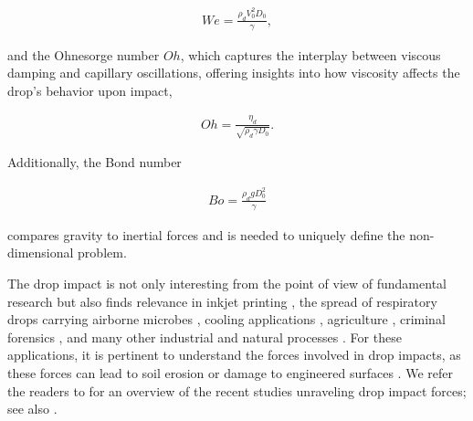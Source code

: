 \documentclass{jfm}
\begin{document}
\begin{align}
	\label{Eq:WeDefinition}
	We = \frac{\rho_d V_0^2 D_0}{\gamma},
\end{align}

\noindent and the Ohnesorge number $Oh$, which captures the interplay between viscous damping and capillary oscillations, offering insights into how viscosity affects the drop's behavior upon impact,

\begin{align}
	\label{Eq:OhDefinition}
	Oh = \frac{\eta_d}{\sqrt{\rho_d \gamma D_0}}.
\end{align}

\noindent Additionally, the Bond number

\begin{align}
	\label{Eq:BoDefinition}
	Bo = \frac{\rho_dgD_0^2}{\gamma}
\end{align}

\noindent compares gravity to inertial forces and is needed to uniquely define the non-dimensional problem.  

The drop impact is not only interesting from the point of view of fundamental research but also finds relevance in inkjet printing \citep{lohse2022fundamental}, the spread of respiratory drops carrying airborne microbes \citep{bourouiba2021fluid, ji2021compound, pohlker2023respiratory}, cooling applications \citep{kim2007spray, shiri2017heat, jowkar2019rebounding}, agriculture \citep{bergeron2000controlling, bartolo2007dynamics, kooij2018determines, sijs2020effect, he2021optimization, hoffman2021controlling}, criminal forensics \citep{smith2018influence, smith-2018-curropincolloidinterfacesci}, and many other industrial and natural processes \citep{rein-1993-fluiddynres, yarin2006drop, Tuteja2007, Cho2016, Josserand2016, Yarin2017, Liu2017, Hao2016, Yarin2017, Wu2020}. For these applications, it is pertinent to understand the forces involved in drop impacts, as these forces can lead to soil erosion \citep{Nearing1986} or damage to engineered surfaces \citep{Ahmad2013, Amirzadeh2017, Gohardani2011}. We refer the readers to \citet{cheng2021drop} for an overview of the recent studies unraveling drop impact forces; see also \citet{Li2014, Soto2014, Philippi2016, Zhang2017, Gordillo2018, Mitchell2019, Zhang2019}. 
\end{document}
